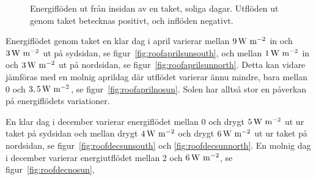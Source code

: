 \begin{figure}[hpbt]
\centering
{}

\caption{\label{fig:rooffigurescloud}Energiflöden ut från insidan av en taket, soliga dagar. Utflöden ut genom taket betecknas positivt, och inflöden negativt.}
\end{figure}

Energiflödet genom taket 
en klar dag i april varierar mellan $\unit[9]{W~m^{-2}}$ in och $\unit[3]{W~m^{-2}}$ ut på sydsidan, se figur~\ref{fig:roofaprilsunsouth}, 
och 
mellan $\unit[1]{W~m^{-2}}$ in och $\unit[3]{W~m^{-2}}$ ut på nordsidan, se figur~\ref{fig:roofaprilsunnorth}. 
Detta kan vidare jämföras med en molnig aprildag där utflödet varierar ännu mindre, bara mellan 0 och $\unit[3,5]{W~m^{-2}}$, se figur~\ref{fig:roofaprilnosun}. Solen har alltså stor en påverkan på energiflödets variationer.

En klar dag i december varierar energiflödet mellan 0 och drygt $\unit[5]{W~m^{-2}}$ ut ur taket på sydsidan och mellan drygt $\unit[4]{W~m^{-2}}$ och drygt $\unit[6]{W~m^{-2}}$ ut ur taket på nordsidan, se figur~\ref{fig:roofdecsunsouth} och \ref{fig:roofdecsunnorth}. En molnig dag i december varierar energiutflödet mellan 2 och $\unit[6]{W~m^{-2}}$, se figur~\ref{fig:roofdecnosun},


